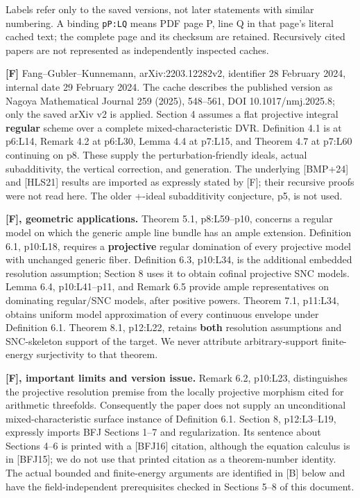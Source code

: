 \documentclass[11pt]{article}
\begin{document}
Labels refer only to the saved versions, not later statements with similar numbering. A binding \texttt{pP:LQ} means PDF page P, line Q in that page's literal cached text; the complete page and its checksum are retained. Recursively cited papers are not represented as independently inspected caches.

\noindent \textbf{[F]} Fang--Gubler--Kunnemann, arXiv:2203.12282v2, identifier 28 February 2024, internal date 29 February 2024. The cache describes the published version as Nagoya Mathematical Journal 259 (2025), 548--561, DOI 10.1017/nmj.2025.8; only the saved arXiv v2 is applied. Section 4 assumes a flat projective integral \textbf{regular} scheme over a complete mixed-characteristic DVR. Definition 4.1 is at p6:L14, Remark 4.2 at p6:L30, Lemma 4.4 at p7:L15, and Theorem 4.7 at p7:L60 continuing on p8. These supply the perturbation-friendly ideals, actual subadditivity, the vertical correction, and generation. The underlying [BMP+24] and [HLS21] results are imported as expressly stated by [F]; their recursive proofs were not read here. The older +-ideal subadditivity conjecture, p5, is not used.

\noindent \textbf{[F], geometric applications.} Theorem 5.1, p8:L59--p10, concerns a regular model on which the generic ample line bundle has an ample extension. Definition 6.1, p10:L18, requires a \textbf{projective} regular domination of every projective model with unchanged generic fiber. Definition 6.3, p10:L34, is the additional embedded resolution assumption; Section 8 uses it to obtain cofinal projective SNC models. Lemma 6.4, p10:L41--p11, and Remark 6.5 provide ample representatives on dominating regular/SNC models, after positive powers. Theorem 7.1, p11:L34, obtains uniform model approximation of every continuous envelope under Definition 6.1. Theorem 8.1, p12:L22, retains \textbf{both} resolution assumptions and SNC-skeleton support of the target. We never attribute arbitrary-support finite-energy surjectivity to that theorem.

\noindent \textbf{[F], important limits and version issue.} Remark 6.2, p10:L23, distinguishes the projective resolution premise from the locally projective morphism cited for arithmetic threefolds. Consequently the paper does not supply an unconditional mixed-characteristic surface instance of Definition 6.1. Section 8, p12:L3--L19, expressly imports BFJ Sections 1--7 and regularization. Its sentence about Sections 4--6 is printed with a [BFJ16] citation, although the equation calculus is in [BFJ15]; we do not use that printed citation as a theorem-number identity. The actual bounded and finite-energy arguments are identified in [B] below and have the field-independent prerequisites checked in Sections 5--8 of this document.
\end{document}
